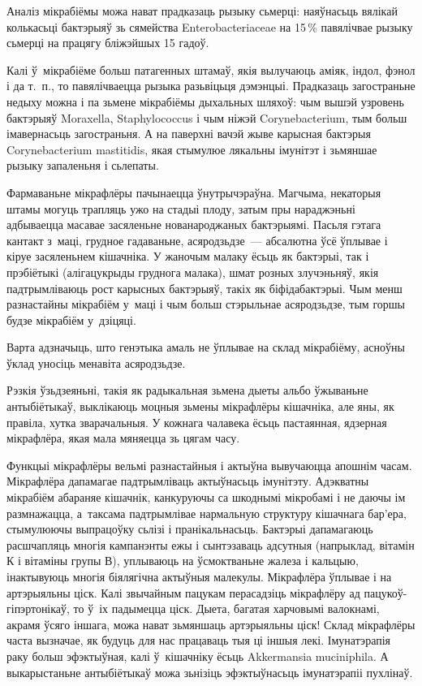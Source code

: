Аналіз мікрабіёмы можа нават прадказаць рызыку сьмерці: наяўнасьць вялікай колькасьці бактэрыяў зь сямейства Enterobacteriaceae на 15\,\% павялічвае рызыку сьмерці на працягу бліжэйшых 15 гадоў.

Калі ў~мікрабіёме больш патагенных штамаў, якія вылучаюць аміяк, індол, фэнол і да т.~п., то павялічваецца рызыка разьвіцьця дэмэнцыі. Прадказаць загостраньне недыху можна і па зьмене мікрабіёмы дыхальных шляхоў: чым вышэй узровень бактэрыяў Moraxella, Staphylococcus і чым ніжэй Corynebacterium, тым больш імавернасьць загостраньня. А на паверхні вачэй жыве карысная бактэрыя Corynebacterium mastitidis, якая стымулюе лякальны імунітэт і зьмяншае рызыку запаленьня і сьлепаты.

Фармаваньне мікрафлёры пачынаецца ўнутрычэраўна. Магчыма, некаторыя штамы могуць трапляць ужо на стадыі плоду, затым пры нараджэньні адбываецца масавае засяленьне нованароджаных бактэрыямі. Пасьля гэтага кантакт з~маці, грудное гадаваньне, асяродзьдзе~--- абсалютна ўсё ўплывае і кіруе засяленьнем кішачніка. У жаночым малаку ёсьць як бактэрыі, так і прэбіётыкі (алігацукрыды груднога малака), шмат розных злучэньняў, якія падтрымліваюць рост карысных бактэрыяў, такіх як біфідабактэрыі. Чым менш разнастайны мікрабіём у~маці і чым больш стэрыльнае асяродзьдзе, тым горшы будзе мікрабіём у~дзіцяці.

Варта адзначыць, што генэтыка амаль не ўплывае на склад мікрабіёму, асноўны ўклад уносіць менавіта асяродзьдзе. 

Рэзкія ўзьдзеяньні, такія як радыкальная зьмена дыеты альбо ўжываньне антыбіётыкаў, выклікаюць моцныя зьмены мікрафлёры кішачніка, але яны, як правіла, хутка зварачальныя. У кожнага чалавека ёсьць пастаянная, ядзерная мікрафлёра, якая мала мяняецца зь цягам часу.

Функцыі мікрафлёры вельмі разнастайныя і актыўна вывучаюцца апошнім часам. Мікрафлёра дапамагае падтрымліваць актыўнасьць імунітэту. Адэкватны мікрабіём абараняе кішачнік, канкуруючы са шкоднымі мікробамі і не даючы ім размнажацца, а~таксама падтрымлівае нармальную структуру кішачнага бар'ера, стымулюючы выпрацоўку сьлізі і пранікальнасьць. Бактэрыі дапамагаюць расшчапляць многія кампанэнты ежы і сынтэзаваць адсутныя (напрыклад, вітамін К і вітаміны групы В), уплываюць на ўсмоктваньне жалеза і кальцыю, інактывуюць многія біялягічна актыўныя малекулы. Мікрафлёра ўплывае і на артэрыяльны ціск. Калі звычайным пацукам перасадзіць мікрафлёру ад пацукоў-гіпэртонікаў, то ў~іх падымецца ціск. Дыета, багатая харчовымі валокнамі, акрамя ўсяго іншага, можа нават зьмяншаць артэрыяльны ціск! Склад мікрафлёры часта вызначае, як будуць для нас працаваць тыя ці іншыя лекі. Імунатэрапія раку больш эфэктыўная, калі ў~кішачніку ёсьць Akkermansia muciniphila. А выкарыстаньне антыбіётыкаў можа зьнізіць эфэктыўнасьць імунатэрапіі пухлінаў.

